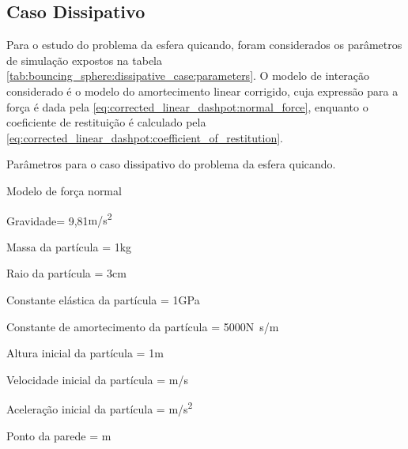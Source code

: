 \subsection{Caso Dissipativo} \label{sec:results:bouncing_sphere:dissipative_case}

Para o estudo do problema da esfera quicando, foram considerados os parâmetros de simulação expostos na tabela \ref{tab:bouncing_sphere:dissipative_case:parameters}. O modelo de interação considerado é o modelo do amortecimento linear corrigido, cuja expressão para a força é dada pela \cref{eq:corrected_linear_dashpot:normal_force}, enquanto o coeficiente de restituição é calculado pela \cref{eq:corrected_linear_dashpot:coefficient_of_restitution}.

\begin{table}[h]
\centering
\caption{Parâmetros para o caso dissipativo do problema da esfera quicando.}
\label{tab:bouncing_sphere:dissipative_case:parameters}
\begin{parametersdesc}
	\item{Modelo de força normal}{}{\emptyUnit}
	\item{Gravidade}{\gravityScalar = 9,81}{\si[per-mode=symbol]{\metre\per\square\second}}
	\hline
	\item{Massa da partícula}{\ind{\mass}{\particle} = 1}{\si\kilogram}
	\item{Raio da partícula}{\ind{\radius}{\particle} = 3}{\si\centi\metre}
	\item{Constante elástica da partícula}{\ind{\elasticModulus}{\particle} = 1}{\si[per-mode=symbol]{\giga\pascal}}
	\item{Constante de amortecimento da partícula}{\ind{\normalDampingConstant}{\particle} = \SI{5000}{}}{\si[per-mode=symbol]{\newton\second\per\meter}}
	\hline
	\item{Altura inicial da partícula}{\initial{\positiony} = 1}{\si{\metre}}
	\item{Velocidade inicial da partícula}{\explicitVector{\initial{\velocityx}}{\initial{\velocityy}}{\initial{\velocityz}} = }{\si[per-mode=symbol]{\metre\per\second}}
	\item{Aceleração inicial da partícula}{\explicitVector{\initial{\accelerationx}}{\initial{\accelerationy}}{\initial{\accelerationz}} = }{\si[per-mode=symbol]{\metre\per\square\second}}
	\hline
	\item{Ponto da parede}{\ind{\planeOrigin}{\element} = }{\si\meter}

\end{parametersdesc}
\end{table}
